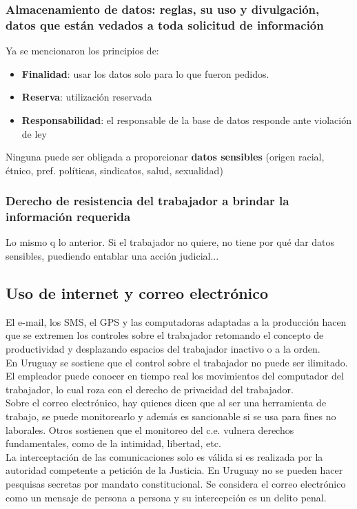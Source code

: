 \documentclass[spanish,12pt,a4paper,titlepage]{report}
\begin{document}
\subsubsection{Almacenamiento de datos: reglas, su uso y divulgación, datos que están vedados a toda solicitud de información}
Ya se mencionaron los principios de:
\begin{itemize}
	\item \textbf{Finalidad}: usar los datos solo para lo que fueron pedidos.
	\item \textbf{Reserva}: utilización reservada
	\item \textbf{Responsabilidad}: el responsable de la base de datos responde ante violación de ley
\end{itemize}
Ninguna puede ser obligada a proporcionar \textbf{datos sensibles} (origen racial, étnico, pref. políticas, sindicatos, salud, sexualidad)\\

\subsubsection{Derecho de resistencia del trabajador a brindar la información requerida}
Lo mismo q lo anterior. Si el trabajador no quiere, no tiene por qué dar datos sensibles, puediendo entablar una acción judicial...

\subsection{Uso de internet y correo electrónico}
El e-mail, los SMS, el GPS y las computadoras adaptadas a la producción hacen que se extremen los controles sobre el trabajador retomando el concepto de productividad y desplazando espacios del trabajador inactivo o a la orden.\\

En Uruguay se sostiene que el control sobre el trabajador no puede ser ilimitado. El empleador puede conocer en tiempo real los movimientos del computador del trabajador, lo cual roza con el derecho de privacidad del trabajador.\\

Sobre el correo electrónico, hay quienes dicen que al ser una herramienta de trabajo, se puede monitorearlo y además es sancionable si se usa para fines no laborales. Otros sostienen que el monitoreo del c.e. vulnera derechos fundamentales, como de la intimidad, libertad, etc.\\
La interceptación de las comunicaciones solo es válida si es realizada por la autoridad competente a petición de la Justicia. En Uruguay no se pueden hacer pesquisas secretas por mandato constitucional. Se considera el correo electrónico como un mensaje de persona a persona y su intercepción es un delito penal.\\
\end{document}
